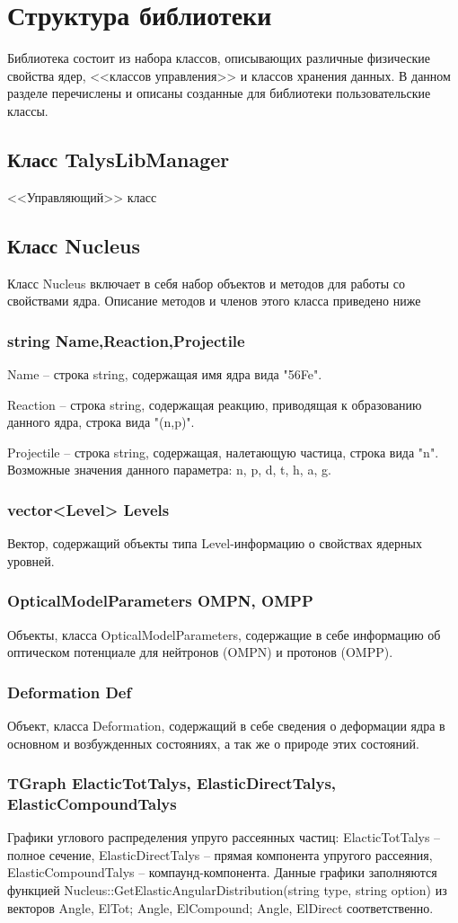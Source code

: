 \documentclass[a4paper,12pt]{extarticle}
\begin{document}
\section{Структура библиотеки}
Библиотека состоит из набора классов, описывающих различные физические свойства ядер, <<классов управления>> и классов хранения данных. В данном разделе перечислены и описаны созданные для библиотеки пользовательские классы. 
\subsection{Класс TalysLibManager}
<<Управляющий>> класс
\subsection{Класс Nucleus}
Класс Nucleus включает в себя набор объектов и методов для работы со свойствами ядра. Описание методов и членов этого класса приведено ниже
\subsubsection{string Name,Reaction,Projectile}
Name -- строка string, содержащая имя ядра вида "56Fe".

Reaction -- строка string, содержащая реакцию, приводящая к образованию данного ядра, строка вида "(n,p)".

Projectile -- строка string, содержащая, налетающую частица, строка вида "n". Возможные значения данного параметра: n, p, d, t, h, a, g.
\subsubsection{vector<Level> Levels}
Вектор, содержащий объекты типа Level-информацию о свойствах ядерных уровней.
\subsubsection{OpticalModelParameters OMPN, OMPP}
Объекты, класса OpticalModelParameters, содержащие в себе информацию об оптическом потенциале для нейтронов (OMPN) и протонов (OMPP).
\subsubsection{Deformation Def}
Объект, класса Deformation, содержащий в себе сведения о деформации ядра в основном и возбужденных состояниях, а так же о природе этих состояний.
\subsubsection{TGraph ElacticTotTalys, ElasticDirectTalys, ElasticCompoundTalys}
Графики углового распределения упруго рассеянных частиц:  ElacticTotTalys -- полное сечение, ElasticDirectTalys -- прямая компонента упругого рассеяния, ElasticCompoundTalys -- компаунд-компонента. Данные графики заполняются функцией Nucleus::GetElasticAngularDistribution(string type, string option) из векторов Angle, ElTot; Angle, ElCompound; Angle, ElDirect соответственно.
\end{document}
